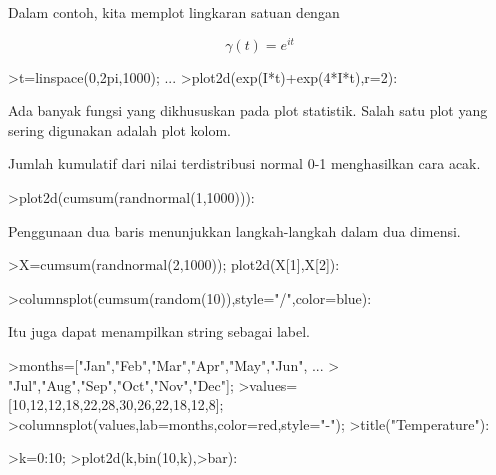 \documentclass{article}
\begin{document}
\begin{eulernotebook}
\begin{eulercomment}
\begin{eulercomment}
\begin{eulercomment}
\begin{eulercomment}
\begin{eulercomment}
Dalam contoh, kita memplot lingkaran satuan dengan

\end{eulercomment}
\begin{eulerformula}
\[
\gamma(t) = e^{it}
\]
\end{eulerformula}
\begin{eulerprompt}
>t=linspace(0,2pi,1000); ...
>plot2d(exp(I*t)+exp(4*I*t),r=2):
\end{eulerprompt}
\begin{eulercomment}
Ada banyak fungsi yang dikhususkan pada plot statistik. Salah satu
plot yang sering digunakan adalah plot kolom.


Jumlah kumulatif dari nilai terdistribusi normal 0-1 menghasilkan cara
acak.
\end{eulercomment}
\begin{eulerprompt}
>plot2d(cumsum(randnormal(1,1000))):
\end{eulerprompt}
\begin{eulercomment}
Penggunaan dua baris menunjukkan langkah-langkah dalam dua dimensi.
\end{eulercomment}
\begin{eulerprompt}
>X=cumsum(randnormal(2,1000)); plot2d(X[1],X[2]):
\end{eulerprompt}
\begin{eulerprompt}
>columnsplot(cumsum(random(10)),style="/",color=blue):
\end{eulerprompt}
\begin{eulercomment}
Itu juga dapat menampilkan string sebagai label.
\end{eulercomment}
\begin{eulerprompt}
>months=["Jan","Feb","Mar","Apr","May","Jun", ...
>  "Jul","Aug","Sep","Oct","Nov","Dec"];
>values=[10,12,12,18,22,28,30,26,22,18,12,8];
>columnsplot(values,lab=months,color=red,style="-");
>title("Temperature"):
\end{eulerprompt}
\begin{eulerprompt}
>k=0:10;
>plot2d(k,bin(10,k),>bar):
\end{eulerprompt}
\begin{eulerprompt}

\end{eulerprompt}
\end{eulercomment}
\end{eulercomment}
\end{eulercomment}
\end{eulercomment}
\end{eulernotebook}
\end{document}
